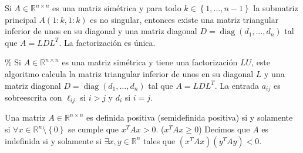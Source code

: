 \begin{theorem}
    Si $A\in\mathbb{R}^{n\times n}$ es una matriz simétrica y para
    todo $k\in\left\{1,\dotsc,n-1\right\}$ la submatriz principal
    $A\left(1:k,1:k\right)$ es no singular, entonces existe una
    matriz triangular inferior de unos en su diagonal y una matriz
    diagonal
    \begin{math}
        D=
        \operatorname{diag}
        \left(d_{1},\dotsc,d_{n}\right)
    \end{math}
    tal que $A=LDL^{T}$.
    La factorización es única.
\end{theorem}

\begin{algorithm}[H]
    \caption{$LDL^{T}$}
    \% Si $A\in\mathbb{R}^{n\times n}$ es una matriz simétrica y
    tiene una factorización $LU$, este algoritmo calcula la matriz
    triangular inferior de unos en su diagonal $L$ y una matriz
    diagonal $D=\operatorname{diag}\left(d_{1},\dotsc,d_{n}\right)$
    tal que $A=LDL^{T}$.
    La entrada $a_{ij}$ es sobreescrita con $\ell_{ij}$ si $i>j$ y
    $d_{i}$ si $i=j$.

\end{algorithm}

\begin{definition}
    Una matriz $A\in\mathbb{R}^{n\times n}$ es definida positiva (semidefinida positiva) si y solamente si
    $\forall x\in\mathbb{R}^{n}\setminus\left\{0\right\}$ se cumple que $x^{T}Ax>0$. ($x^{T}Ax\geq 0$)
    Decimos que $A$ es indefinida si y solamente si $\exists x,y\in\mathbb{R}^{n}$ tales que
    \begin{math}
        \left(x^{T}Ax\right)
        \left(y^{T}Ay\right)<0
    \end{math}.
\end{definition}

